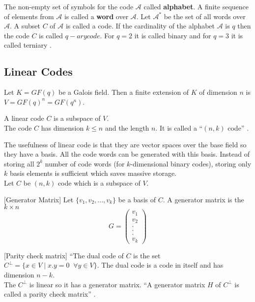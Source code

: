 The non-empty set of symbols for the code \(\mathcal{A}\) called \textbf{alphabet}. A finite sequence of elements from \(\mathcal{A}\) is called a \textbf{word} over \(\mathcal{A}\). Let \(\mathcal{A}^*\) be the set of all words over \(\mathcal{A}\). A subset \(C\) of \(\mathcal{A}\) is called a code.
If the cardinality of the alphabet \(\mathcal{A}\) is \(q\) then the code \(C\) is called \(q-ary code\). For \(q=2\) it is called binary and for \(q=3\) it is called terniary \cite{error_correct}.

\subsection{Linear Codes}
Let \(K=GF(q)\) be a Galois field. Then a finite extension of \(K\) of dimension \(n\) is \(V=GF(q)^n=GF(q^n)\).
\begin{definition} \cite{coding}
  A linear code \(C\) is a subspace of \(V\). \\
  The code \(C\) has dimension \(k \leq n\) and the length \(n\). It is called a ``\((n,k)\) code'' \cite{error_correct}.
\end{definition}

The usefulness of linear code is that they are vector spaces over the base field so they have a basis. All the code words can be generated with this basis. Instead of storing all \(2^k\) number of code words (for \(k\)-dimensional binary codes), storing only \(k\) basis elements is sufficient which saves massive storage.\\[2mm]
Let \(C\) be \((n,k)\) code which is a subspace of \(V\).

\begin{definition} \cite{error_correct} [Generator Matrix]
  Let \(\{v_1, v_2,...,v_k\}\) be a basis of \(C\). A generator matrix is the \(k \times n\)
  \[G=\begin{pmatrix}
      v_1\\
      v_2\\
      .\\
      .\\
      .\\
      v_k
    \end{pmatrix}
  \]
\end{definition}
\vspace{2mm}

\begin{definition} \cite{error_correct} [Parity check matrix]
  ``The dual code of \(C\) is the set \(C^{\perp}=\{x \in V \;| \; x.y=0 \;\; \forall y \in V \}\). The dual code is a code in itself and has dimension \(n-k\).\\
  The \(C^{\perp}\) is linear so it has a generator matrix. ``A generator matrix \(H\) of \(C^{\perp}\) is called a parity check matrix'' \cite{error_correct}.
\end{definition}

